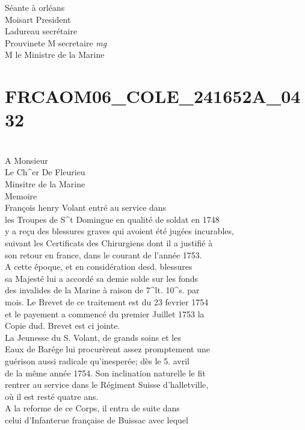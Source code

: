 \documentclass{article}
\begin{document}
\begin{pages}
Séante à orléans\\
Moisart President\\
Ladureau secrétaire\\
Prouvinete M secretaire
\pend
\vspace{0.5cm}\noindent
\textit{mg}
\footnotesize \\
M le Ministre de la Marine
\normalsize 
\endnumbering\beginnumbering\section{FRCAOM06\_COLE\_241652A\_0432}\pstart
\\
A Monsieur\\
Le Ch\^{}er De Fleurieu\\
Minsitre de la Marine\\
Memoire\\
François henry Volant entré au service dans\\
les Troupes de S\^{}t Domingue en qualité de soldat en 1748\\
y a reçu des blessures graves qui avoient été jugées incurables,\\
suivant les Certificats des Chirurgiens dont il a justifié à\\
son retour en france, dans le courant de l'année 1753.\\
A cette époque, et en considération desd. blessures\\
sa Majesté lui a accordé sa demie solde sur les fonds\\
des invalides de la Marine à raison de 7\^{}lt. 10\^{}s. par\\
mois. Le Brevet de ce traitement est du 23 fevrier 1754\\
et le payement a commencé du premier Juillet 1753 la\\
Copie dud. Brevet est ci jointe.\\
La Jeunesse du S. Volant, de grands soins et les\\
Eaux de Barége lui procurèrent assez promptement une\\
guérison aussi radicale qu'inesperée; dès le 5. avril\\
de la même année 1754. Son inclination naturelle le fit\\
rentrer au service dans le Régiment Suisse d'halletville,\\
où il est resté quatre ans.\\
A la reforme de ce Corps, il entra de suite dans\\
celui d'Infanterue française de Buissac avec lequel

\end{pages}
\end{document}
